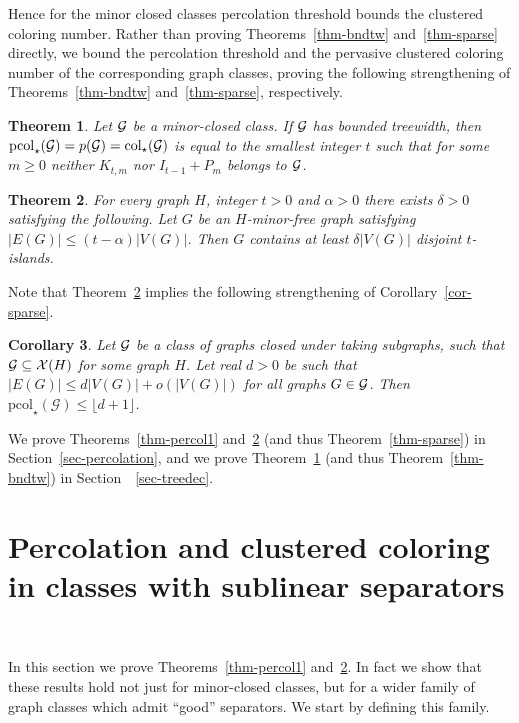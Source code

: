 \documentclass[12pt]{article}
\newcommand{\GG}{{\cal G}}
\newtheorem{theorem}{Theorem}
\newtheorem{corollary}[theorem]{Corollary}
\newcommand{\col}{\text{col}}
\newcommand{\mc}[1]{\mathcal{#1}}
\begin{document}
Hence for the minor closed classes percolation threshold bounds the clustered coloring number. Rather than proving Theorems~\ref{thm-bndtw} and~\ref{thm-sparse} directly, we bound the percolation threshold and the pervasive clustered coloring number of the corresponding graph classes, proving the following strengthening of Theorems~\ref{thm-bndtw} and~\ref{thm-sparse}, respectively. 

\begin{theorem}\label{thm-pbndtw}
Let $\GG$ be a minor-closed class.  If $\GG$ has bounded treewidth, then $\text{pcol}_\star(\GG)=p(\GG)=\col_\star(\GG)$ is equal to the smallest integer $t$ such that for some $m\ge 0$ neither $K_{t,m}$ nor $I_{t-1}+P_m$ belongs to $\GG$. 
\end{theorem}

\begin{theorem}\label{thm-psparse}
	For every graph $H$, integer $t>0$ and $\alpha >0$ there exists $\delta>0$ satisfying the following. Let $G$ be an $H$-minor-free graph satisfying $|E(G)| \leq (t -\alpha)|V(G)|$. Then $G$ contains at least $\delta|V(G)|$ disjoint $t$-islands. 
\end{theorem}

Note that Theorem~\ref{thm-psparse} implies the following strengthening of Corollary~\ref{cor-sparse}.

\begin{corollary}\label{cor-psparse}
Let $\GG$ be a class of graphs closed under taking subgraphs, such that $\GG \subseteq \mc{X}(H)$ for some graph $H$. Let real $d > 0$ be such that $|E(G)|\leq d|V(G)|+o(|V(G)|)$ for all graphs $G\in\GG$. Then $\text{pcol}_\star(\mc{G}) \leq  \lfloor d+1 \rfloor$.
\end{corollary}

We prove Theorems~\ref{thm-percol1} and~\ref{thm-psparse} (and thus Theorem~\ref{thm-sparse})   in Section~\ref{sec-percolation}, and we prove
Theorem~\ref{thm-pbndtw} (and thus Theorem~\ref{thm-bndtw}) in Section~~\ref{sec-treedec}.
  
\section{Percolation and clustered coloring in classes with sublinear separators}~\label{sec-percolation}

In this section we prove Theorems~\ref{thm-percol1} and~\ref{thm-psparse}. In
fact we show that these results hold not just for minor-closed classes, but for
a wider family of graph classes which admit ``good'' separators. We start by
defining this family. 
\end{document}
